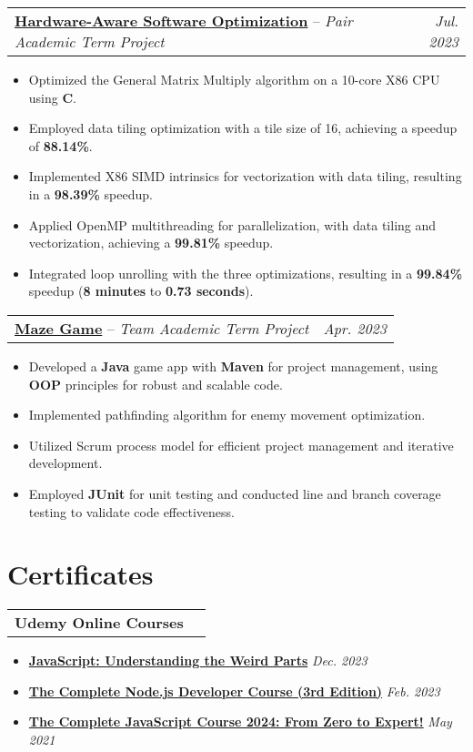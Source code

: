 \documentclass[letterpaper,11pt]{article}
\makeatletter
\newcommand{\resumeItemUpdated}[1]{
  \item\small{
    {#1 \vspace{-7pt}}
  }
}
\newcommand{\projectSubheading}[3]{
  \vspace{-1pt}
    \begin{tabular*}{1\textwidth}{l@{\extracolsep{\fill}}r}
      \textbf{#1} -- {\textit{#2}} & #3 \\
    \end{tabular*}\vspace{-5pt}
}
\newcommand{\projectSubheadingUpdated}[1]{
  \vspace{-1pt}
    \begin{tabular*}{1\textwidth}{l@{\extracolsep{\fill}}r}
      \textbf{#1} \\
    \end{tabular*}\vspace{-5pt}
}
\newcommand{\resumeItemListStart}{\begin{itemize}[leftmargin=*]}
\newcommand{\resumeItemListEnd}{\end{itemize}\vspace{-5pt}}
\makeatother
\begin{document}
 \vspace{6pt}\projectSubheading
      {\href{https://github.com/jayhonglee/Hardware-Aware-Software-Optimization}{Hardware-Aware Software Optimization}}{Pair Academic Term Project}{\textit{\small Jul. 2023}}
      \resumeItemListStart
        \resumeItemUpdated
          {Optimized the General Matrix Multiply algorithm on a 10-core X86 CPU using \textbf{C}.}
        \resumeItemUpdated
          {Employed data tiling optimization with a tile size of 16, achieving a speedup of \textbf{88.14\%}.}
        \resumeItemUpdated
          {Implemented X86 SIMD intrinsics for vectorization with data tiling, resulting in a \textbf{98.39\%} speedup.}
        \resumeItemUpdated
          {Applied OpenMP multithreading for parallelization, with data tiling and vectorization, achieving a \textbf{99.81\%} speedup.}
        \resumeItemUpdated
          {Integrated loop unrolling with the three optimizations, resulting in a \textbf{99.84\%} speedup (\textbf{8 minutes} to \textbf{0.73 seconds}).}
      \resumeItemListEnd
      
 \vspace{6pt}\projectSubheading
      {\href{https://github.com/jayhonglee/mazeGame}{Maze Game}}{Team Academic Term Project}{\textit{\small Apr. 2023}}
      \resumeItemListStart
        \resumeItemUpdated
          {Developed a \textbf{Java} game app with \textbf{Maven} for project management, using \textbf{OOP} principles for robust and scalable code.}
        \resumeItemUpdated
          {Implemented pathfinding algorithm for enemy movement optimization.}
        \resumeItemUpdated
          {Utilized Scrum process model for efficient project management and iterative development.}
        \resumeItemUpdated
          {Employed \textbf{JUnit} for unit testing and conducted line and branch coverage testing to validate code effectiveness.}
      \resumeItemListEnd
      

%
\section{Certificates}
 \projectSubheadingUpdated
      {Udemy Online Courses}
      \resumeItemListStart
        \resumeItemUpdated
          {\textbf{\href{https://www.udemy.com/course/understand-javascript/}{JavaScript: Understanding the Weird Parts}} \hfill \textit{Dec. 2023}}
        \resumeItemUpdated
          {\textbf{\href{https://www.udemy.com/course/the-complete-nodejs-developer-course-2/}{The Complete Node.js Developer Course (3rd Edition)}} \hfill \textit{Feb. 2023}}
        \resumeItemUpdated
          {\textbf{\href{https://www.udemy.com/course/the-complete-javascript-course/}{The Complete JavaScript Course 2024: From Zero to Expert!}} \hfill \textit{May 2021}}
       \resumeItemListEnd
\end{document}
